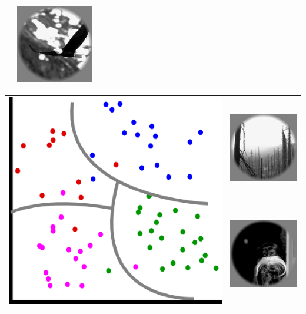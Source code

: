 \documentclass{beamer}
\begin{document}
\begin{frame}
\begin{multicols}{2}
\begin{tabular}{cc}
& \includegraphics[scale = 0.2]{img3.png} \\ 
\end{tabular}
\columnbreak


\begin{tabular}{cc}
\multirow{4}{*}{\includegraphics[scale = 0.3]{four_class.png}} 
& \includegraphics[scale = 0.2]{img5.png} \\
& \includegraphics[scale = 0.2]{img6.png} \\

\end{tabular}
\end{multicols}
\end{frame}
\end{document}
